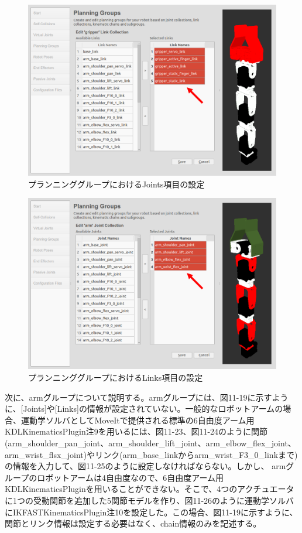 \begin{figure}[ht]
  \centering
  \includegraphics[width=\columnwidth]{pictures/chapter11/pic_11_21.png}
  \caption{プランニンググループにおけるJoints項目の設定}
\end{figure}

\begin{figure}[ht]
  \centering
  \includegraphics[width=\columnwidth]{pictures/chapter11/pic_11_22.png}
  \caption{プランニンググループにおけるLinks項目の設定}
\end{figure}

次に、armグループについて説明する。armグループには、図11-19に示すように、[Joints]や[Links]の情報が設定されていない。一般的なロボットアームの場合、運動学ソルバとしてMoveItで提供される標準の6自由度アーム用KDLKinematicsPlugin注9を用いるには、図11-23、図11-24のように関節(arm\_shoulder\_pan\_joint、arm\_shoulder\_lift\_joint、arm\_elbow\_flex\_joint、arm\_wrist\_flsx\_joint)やリンク(arm\_base\_linkからarm\_wrist\_F3\_0\_linkまで)の情報を入力して、図11-25のように設定しなければならない。しかし、 armグループのロボットアームは4自由度なので、6自由度アーム用KDLKinematicsPluginを用いることができない。そこで、4つのアクチュエータに1つの受動関節を追加した5関節モデルを作り、図11-26のように運動学ソルバにIKFASTKinematicsPlugin注10を設定した。この場合、図11-19に示すように、関節とリンク情報は設定する必要はなく、chain情報のみを記述する。

